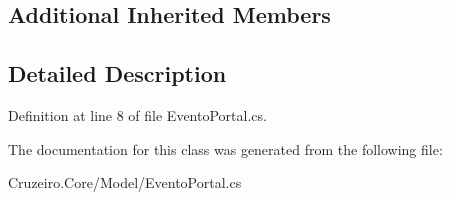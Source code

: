 \subsection*{Additional Inherited Members}


\subsection{Detailed Description}


Definition at line 8 of file Evento\+Portal.\+cs.



The documentation for this class was generated from the following file\+:\begin{DoxyCompactItemize}
\item 
Cruzeiro.\+Core/\+Model/Evento\+Portal.\+cs\end{DoxyCompactItemize}
